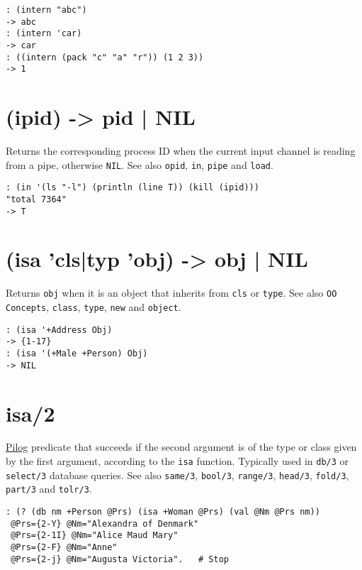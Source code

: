 {{{{{{\begin{verbatim}
: (intern "abc")
-> abc
: (intern 'car)
-> car
: ((intern (pack "c" "a" "r")) (1 2 3))
-> 1
\end{verbatim}

 
\section{(ipid) -> pid | NIL}
\label{sec-8-1-9-17}


Returns the corresponding process ID when the current input channel is
reading from a pipe, otherwise \texttt{NIL}. See also \texttt{opid}, \texttt{in}, \texttt{pipe} and
\texttt{load}.


\begin{verbatim}
: (in '(ls "-l") (println (line T)) (kill (ipid)))
"total 7364"
-> T
\end{verbatim}

 
\section{(isa 'cls|typ 'obj) -> obj | NIL}
\label{sec-8-1-9-18}


Returns \texttt{obj} when it is an object that inherits from \texttt{cls} or \texttt{type}.
See also \texttt{OO Concepts}, \texttt{class}, \texttt{type}, \texttt{new} and \texttt{object}.


\begin{verbatim}
: (isa '+Address Obj)
-> {1-17}
: (isa '(+Male +Person) Obj)
-> NIL
\end{verbatim}

 
\section{isa/2}
\label{sec-8-1-9-19}


\hyperref[ref.html-pilog]{Pilog} predicate that succeeds if the second argument
is of the type or class given by the first argument, according to the
\texttt{isa} function. Typically used in \texttt{db/3} or \texttt{select/3} database queries.
See also \texttt{same/3}, \texttt{bool/3}, \texttt{range/3}, \texttt{head/3}, \texttt{fold/3}, \texttt{part/3} and
\texttt{tolr/3}.


\begin{verbatim}
: (? (db nm +Person @Prs) (isa +Woman @Prs) (val @Nm @Prs nm))
 @Prs={2-Y} @Nm="Alexandra of Denmark"
 @Prs={2-1I} @Nm="Alice Maud Mary"
 @Prs={2-F} @Nm="Anne"
 @Prs={2-j} @Nm="Augusta Victoria".   # Stop
\end{verbatim}

}}}}}}
